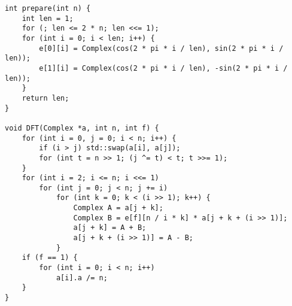 \begin{lstlisting}
int prepare(int n) {
	int len = 1;
	for (; len <= 2 * n; len <<= 1);
	for (int i = 0; i < len; i++) {
		e[0][i] = Complex(cos(2 * pi * i / len), sin(2 * pi * i / len));
		e[1][i] = Complex(cos(2 * pi * i / len), -sin(2 * pi * i / len));
	}
	return len;
}

void DFT(Complex *a, int n, int f) {
	for (int i = 0, j = 0; i < n; i++) {
		if (i > j) std::swap(a[i], a[j]);
		for (int t = n >> 1; (j ^= t) < t; t >>= 1);
	}
	for (int i = 2; i <= n; i <<= 1)
		for (int j = 0; j < n; j += i)
			for (int k = 0; k < (i >> 1); k++) {
				Complex A = a[j + k];
				Complex B = e[f][n / i * k] * a[j + k + (i >> 1)];
				a[j + k] = A + B;
				a[j + k + (i >> 1)] = A - B;
			}
	if (f == 1) {
		for (int i = 0; i < n; i++)
			a[i].a /= n;
	}
}
\end{lstlisting}
